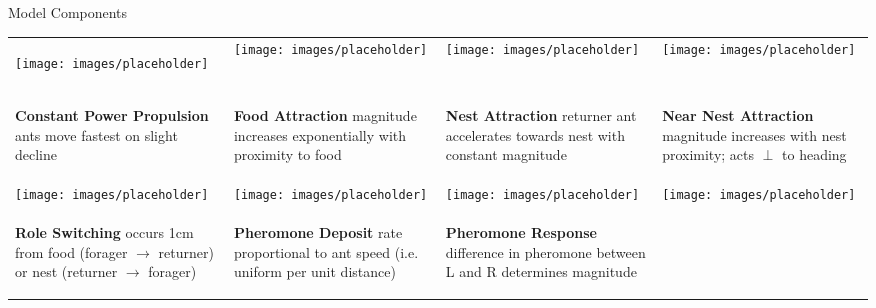 \begin{block}{Model Components}
\vspace{-5ex}
\begin{tabular}{*{4}{>{\centering\arraybackslash}p{}}}
\begin{centering}
\texttt{[image: images/placeholder]}
\end{centering} &
\texttt{[image: images/placeholder]} &
\texttt{[image: images/placeholder]} & 
\texttt{[image: images/placeholder]} \\
\begin{spacing}{1.0}
\raggedright{\small
\textbf{Constant Power Propulsion} ants move fastest on slight decline}
\end{spacing} &
\begin{spacing}{1.0}
\raggedright{\small
\textbf{Food Attraction} magnitude increases exponentially with proximity to food}
\end{spacing} &
\begin{spacing}{1.0}
\raggedright{\small
\textbf{Nest Attraction} returner ant accelerates towards nest with constant magnitude}
\end{spacing} &
\begin{spacing}{1.0}
\raggedright{\small
\textbf{Near Nest Attraction} magnitude increases with nest proximity; acts $\perp$ to heading}
\end{spacing}
\\[-1.5cm]
\texttt{[image: images/placeholder]} &
\texttt{[image: images/placeholder]} &
\texttt{[image: images/placeholder]} &
\texttt{[image: images/placeholder]} \\
\begin{spacing}{1.0}
\raggedright{\small
\textbf{Role Switching} occurs 1cm from food (forager $\rightarrow$ returner) or nest (returner $\rightarrow$ forager)}
\end{spacing} &
\begin{spacing}{1.0}
\raggedright{\small
\textbf{Pheromone Deposit} rate proportional to ant speed (i.e. uniform per unit distance)}
\end{spacing} &
\begin{spacing}{1.0}
\raggedright{\small
\textbf{Pheromone Response} difference in pheromone between L and R determines magnitude}
\end{spacing} &
\begin{spacing}{1.0}

\end{spacing}
\end{tabular}
\end{block}
